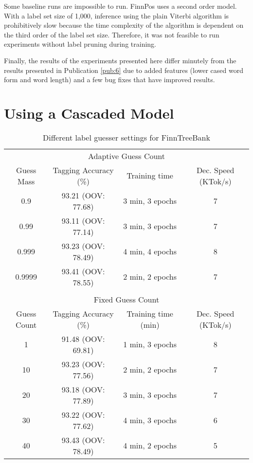 Some baseline runs are impossible to run. FinnPos uses a second order
model. With a label set size of 1,000, inference using the plain
Viterbi algorithm is prohibitively slow because the time complexity of
the algorithm is dependent on the third order of the label set size.
Therefore, it was not feasible to run experiments without label
pruning during training.

Finally, the results of the experiments presented here differ minutely
from the results presented in Publication \ref{pub:6} due to added
features (lower cased word form and word length) and a few bug fixes
that have improved results.

\section{Using a Cascaded Model}

\begin{table}[htb!]
\begin{center}
\begin{tabular}{cccc}
\multicolumn{4}{c}{Adaptive Guess Count}\\
Guess Mass & Tagging Accuracy (\%) & Training time & Dec. Speed (KTok/s)\\
\hline
0.9        & 93.21 (OOV: 77.68) & 3 min, 3 epochs &   7          \\
0.99       & 93.11 (OOV: 77.14) & 3 min, 3 epochs & 7            \\
0.999      & 93.23 (OOV: 78.49) & 4 min, 4 epochs            & 8            \\
0.9999      & 93.41 (OOV: 78.55) & 2 min, 2 epochs            & 7            \\
           &                  &               &               \\
\multicolumn{4}{c}{Fixed Guess Count}\\
Guess Count & Tagging Accuracy (\%) & Training time (min) & Dec. Speed (KTok/s) \\
\hline
1        & 91.48 (OOV: 69.81)           & 1 min, 3 epochs            & 8            \\
10       & 93.23 (OOV: 77.56)           & 2 min, 2 epochs            & 7            \\
20       & 93.18 (OOV: 77.89)           & 3 min, 3 epochs            & 7            \\
30       & 93.22 (OOV: 77.62)           & 4 min, 3 epochs            & 6            \\
40       & 93.43 (OOV: 78.49)           & 4 min, 2 epochs            & 5            \\
\end{tabular}
\caption{Different label guesser settings for FinnTreeBank}
\end{center}
\end{table}


